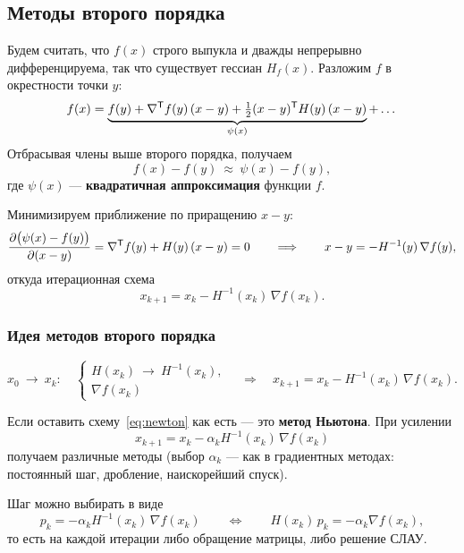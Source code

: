 \subsection{Методы второго порядка}
\label{subsec:second-order}

Будем считать, что $f(x)$ строго выпукла и дважды непрерывно дифференцируема,
так что существует гессиан $H_f(x)$. Разложим $f$ в окрестности точки $y$:
\[
  f(x) = \underbrace{f(y) + \nabla^{\mathsf{T}} f(y)\,(x - y)
         + \tfrac{1}{2}(x-y)^{\mathsf{T}} H(y)\,(x-y)}_{\psi(x)} + \dots
\]
Отбрасывая члены выше второго порядка, получаем
\[
  f(x) - f(y) \ \approx\ \psi(x) - f(y) ,
\]
где $\psi(x)$ — \textbf{квадратичная аппроксимация} функции $f$.

Минимизируем приближение по приращению $x - y$:
\[
  \frac{\partial\big(\psi(x) - f(y)\big)}{\partial (x-y)}
  = \nabla^{\mathsf{T}} f(y) + H(y)\,(x - y) = 0
  \qquad\Longrightarrow\qquad
  x - y = -H^{-1}(y)\,\nabla f(y) ,
\]
откуда итерационная схема
\begin{equation}\label{eq:newton}
  x_{k+1} = x_k - H^{-1}(x_k)\, \nabla f(x_k) .
\end{equation}

\subsubsection*{Идея методов второго порядка}

\[
  x_0 \ \longrightarrow\ x_k :
  \quad
  \begin{cases}
    H(x_k) \ \longrightarrow\ H^{-1}(x_k), \\
    \nabla f(x_k)
  \end{cases}
  \quad \Longrightarrow \quad
  x_{k+1} = x_k - H^{-1}(x_k)\,\nabla f(x_k) .
\]

Если оставить схему~\eqref{eq:newton} как есть — это \textbf{метод Ньютона}.
При усилении
\[
  x_{k+1} = x_k - \alpha_k H^{-1}(x_k)\, \nabla f(x_k)
\]
получаем различные методы (выбор $\alpha_k$ — как в градиентных методах:
постоянный шаг, дробление, наискорейший спуск).

Шаг можно выбирать в виде
\[
  p_k = -\alpha_k H^{-1}(x_k)\,\nabla f(x_k)
  \qquad\Longleftrightarrow\qquad
  H(x_k)\, p_k = -\alpha_k \nabla f(x_k) ,
\]
то есть на каждой итерации либо обращение матрицы, либо решение СЛАУ.

